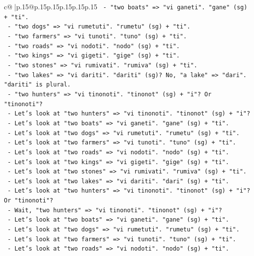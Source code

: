 \documentclass{article}
\begin{document}
{\begin{supertabular}{c@{$\;$}|p{.15\linewidth}@{}p{.15\linewidth}p{.15\linewidth}p{.15\linewidth}p{.15\linewidth}p{.15\linewidth}}
{{{\texttt{    {-} "two boats" => "vi ganeti". "gane" (sg) + "ti".} \\
\texttt{    {-} "two dogs" => "vi rumetuti". "rumetu" (sg) + "ti".} \\
\texttt{    {-} "two farmers" => "vi tunoti". "tuno" (sg) + "ti".} \\
\texttt{    {-} "two roads" => "vi nodoti". "nodo" (sg) + "ti".} \\
\texttt{    {-} "two kings" => "vi gigeti". "gige" (sg) + "ti".} \\
\texttt{    {-} "two stones" => "vi rumivati". "rumiva" (sg) + "ti".} \\
\texttt{    {-} "two lakes" => "vi dariti". "dariti" (sg)? No, "a lake" => "dari". "dariti" is plural.} \\
\texttt{    {-} "two hunters" => "vi tinonoti". "tinonot" (sg) + "i"? Or "tinonoti"?} \\
\texttt{    {-} Let's look at "two hunters" => "vi tinonoti". "tinonot" (sg) + "i"?} \\
\texttt{    {-} Let's look at "two boats" => "vi ganeti". "gane" (sg) + "ti".} \\
\texttt{    {-} Let's look at "two dogs" => "vi rumetuti". "rumetu" (sg) + "ti".} \\
\texttt{    {-} Let's look at "two farmers" => "vi tunoti". "tuno" (sg) + "ti".} \\
\texttt{    {-} Let's look at "two roads" => "vi nodoti". "nodo" (sg) + "ti".} \\
\texttt{    {-} Let's look at "two kings" => "vi gigeti". "gige" (sg) + "ti".} \\
\texttt{    {-} Let's look at "two stones" => "vi rumivati". "rumiva" (sg) + "ti".} \\
\texttt{    {-} Let's look at "two lakes" => "vi dariti". "dari" (sg) + "ti".} \\
\texttt{    {-} Let's look at "two hunters" => "vi tinonoti". "tinonot" (sg) + "i"? Or "tinonoti"?} \\
\texttt{    {-} Wait, "two hunters" => "vi tinonoti". "tinonot" (sg) + "i"?} \\
\texttt{    {-} Let's look at "two boats" => "vi ganeti". "gane" (sg) + "ti".} \\
\texttt{    {-} Let's look at "two dogs" => "vi rumetuti". "rumetu" (sg) + "ti".} \\
\texttt{    {-} Let's look at "two farmers" => "vi tunoti". "tuno" (sg) + "ti".} \\
\texttt{    {-} Let's look at "two roads" => "vi nodoti". "nodo" (sg) + "ti".} \\
}}}
\end{supertabular}}
\end{document}
